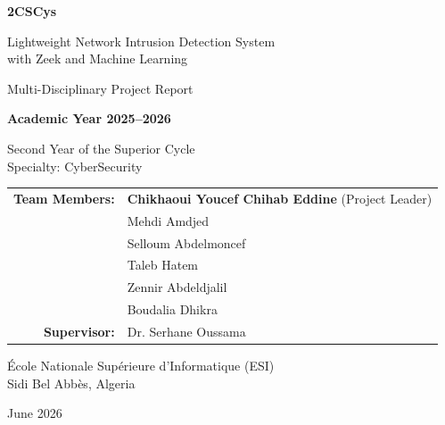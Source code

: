 \documentclass[12pt,a4paper,twoside]{report}
\begin{document}
\begin{titlepage}
\begin{center}

\vspace*{3cm}

{\Huge \bfseries 2CSCys}

\vspace{0.5cm}

{\LARGE Lightweight Network Intrusion Detection System\\[3pt]
with Zeek and Machine Learning}

\vspace{1cm}

{\large Multi-Disciplinary Project Report}

\vspace{2cm}

\textbf{Academic Year 2025--2026}

\vspace{1cm}

{\large Second Year of the Superior Cycle}\\[3pt]
{\large Specialty: CyberSecurity}

\vspace{2cm}

\begin{tabular}{rl}
\textbf{Team Members:} & \textbf{Chikhaoui Youcef Chihab Eddine} (Project Leader) \\
                        & Mehdi Amdjed \\
                        & Selloum Abdelmoncef \\
                        & Taleb Hatem \\
                        & Zennir Abdeldjalil \\
                        & Boudalia Dhikra \\[10pt]
\textbf{Supervisor:}    & Dr. Serhane Oussama
\end{tabular}

\vspace{2cm}

{\large École Nationale Supérieure d'Informatique (ESI)}\\[3pt]
{\large Sidi Bel Abbès, Algeria}

\vfill

{\small June 2026}

\end{center}
\end{titlepage}
\end{document}
